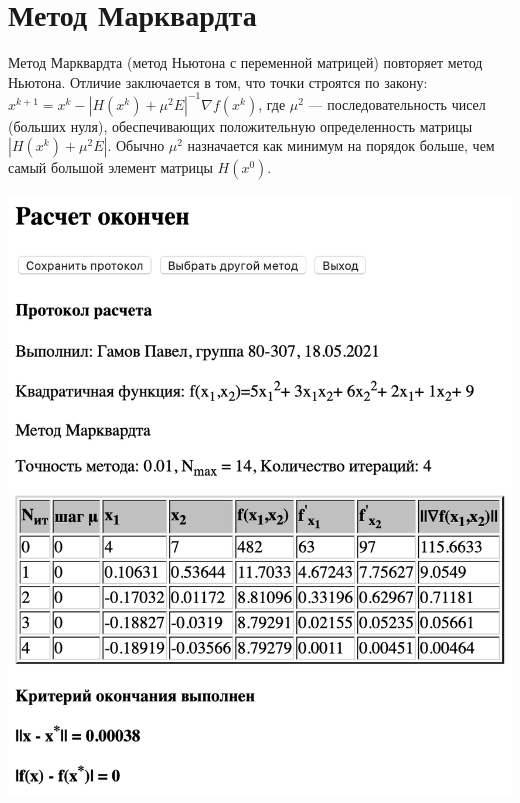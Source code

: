 \section{Метод Марквардта}

Метод Марквардта (метод Ньютона с переменной матрицей) повторяет метод Ньютона. Отличие заключается в том, что точки строятся по закону:
$ x^{k+1} = x^{k} - |H(x^{k}) + \mu^{2}E|^{-1} \nabla f(x^{k})$, где $\mu^{2}$ --- последовательность чисел (больших нуля), обеспечивающих положительную определенность матрицы $|H(x^{k}) + \mu^{2}E|$. Обычно $\mu^{2}$ назначается как минимум на порядок больше, чем самый большой элемент матрицы $H(x^{0})$.

\includegraphics[width=\linewidth]{images/5_rep}\\
